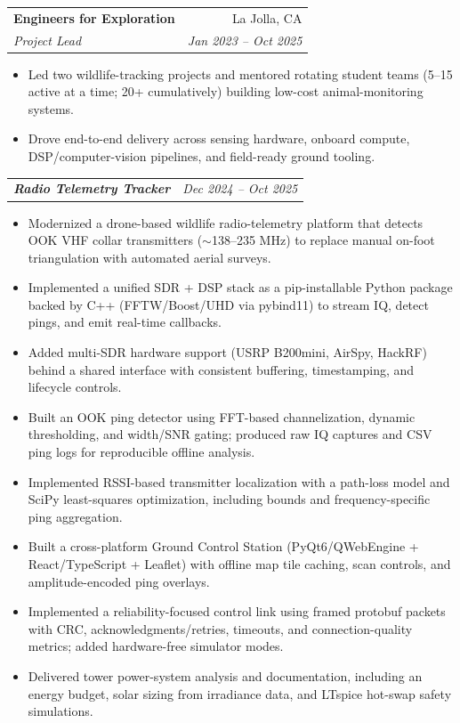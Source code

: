 \documentclass[letterpaper,11pt]{article}
\makeatletter
\newcommand{\resumeItem}[1]{
  \item\small{
    {#1 \vspace{-2pt}}
  }
}
\newcommand{\resumeSubheading}[4]{
  \vspace{-1pt}\item
    \begin{tabular*}{0.97\textwidth}[t]{l@{\extracolsep{\fill}}r}
      \textbf{#1} & #2 \\
      \textit{\small#3} & \textit{\small #4} \\
    \end{tabular*}\vspace{-5pt}
}
\newcommand{\resumeSubSubheading}[2]{
    \begin{tabular*}{0.97\textwidth}{l@{\extracolsep{\fill}}r}
      \textit{\small\textbf{#1}} & \textit{\small #2} \\
    \end{tabular*}\vspace{-5pt}
}
\newcommand{\resumeItemListStart}{\begin{itemize}}
\newcommand{\resumeItemListEnd}{\end{itemize}\vspace{-5pt}}
\makeatother
\begin{document}
    \resumeSubheading
      {Engineers for Exploration}{La Jolla, CA}
      {Project Lead}{Jan 2023 -- Oct 2025}
      \resumeItemListStart
        \resumeItem{Led two wildlife-tracking projects and mentored rotating student teams (5--15 active at a time; 20+ cumulatively) building low-cost animal-monitoring systems.}
        \resumeItem{Drove end-to-end delivery across sensing hardware, onboard compute, DSP/computer-vision pipelines, and field-ready ground tooling.}
      \resumeItemListEnd

      \resumeSubSubheading
        {Radio Telemetry Tracker}{Dec 2024 -- Oct 2025}
        \resumeItemListStart
          \resumeItem{Modernized a drone-based wildlife radio-telemetry platform that detects OOK VHF collar transmitters ($\sim$138--235 MHz) to replace manual on-foot triangulation with automated aerial surveys.}
          \resumeItem{Implemented a unified SDR + DSP stack as a pip-installable Python package backed by C++ (FFTW/Boost/UHD via pybind11) to stream IQ, detect pings, and emit real-time callbacks.}
          \resumeItem{Added multi-SDR hardware support (USRP B200mini, AirSpy, HackRF) behind a shared interface with consistent buffering, timestamping, and lifecycle controls.}
          \resumeItem{Built an OOK ping detector using FFT-based channelization, dynamic thresholding, and width/SNR gating; produced raw IQ captures and CSV ping logs for reproducible offline analysis.}
          \resumeItem{Implemented RSSI-based transmitter localization with a path-loss model and SciPy least-squares optimization, including bounds and frequency-specific ping aggregation.}
          \resumeItem{Built a cross-platform Ground Control Station (PyQt6/QWebEngine + React/TypeScript + Leaflet) with offline map tile caching, scan controls, and amplitude-encoded ping overlays.}
          \resumeItem{Implemented a reliability-focused control link using framed protobuf packets with CRC, acknowledgments/retries, timeouts, and connection-quality metrics; added hardware-free simulator modes.}
          \resumeItem{Delivered tower power-system analysis and documentation, including an energy budget, solar sizing from irradiance data, and LTspice hot-swap safety simulations.}
        \resumeItemListEnd
\end{document}
